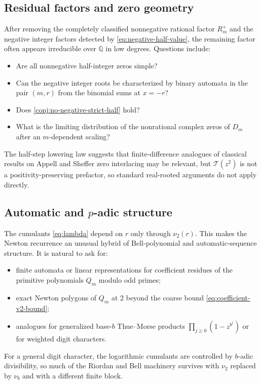 \documentclass[11pt,oneside]{article}
\theoremstyle{definition}
\theoremstyle{remark}
\newcommand{\Q}{\mathbb Q}
\newcommand{\Diag}{D}
\newcommand{\TM}{\mathcal T}
\newcommand{\vtwo}{\nu_{2}}
\begin{document}
\subsection{Residual factors and zero geometry}

After removing the completely classified nonnegative rational factor
$R_m^+$ and the negative integer factors detected by
\eqref{eq:negative-half-value}, the remaining factor often appears
irreducible over $\Q$ in low degrees.  Questions include:
\begin{itemize}
 \item Are all nonnegative half-integer zeros simple?
 \item Can the negative integer roots be characterized by binary automata in
       the pair $(m,r)$ from the binomial sums at $x=-r$?
 \item Does \cref{conj:no-negative-strict-half} hold?
 \item What is the limiting distribution of the nonrational complex zeros of
       $\Diag_m$ after an $m$-dependent scaling?
\end{itemize}
The half-step lowering law suggests that finite-difference analogues of
classical results on Appell and Sheffer zero interlacing may be relevant, but
$\TM(z^2)$ is not a positivity-preserving prefactor, so standard real-rooted
arguments do not apply directly.

\subsection{Automatic and \texorpdfstring{$p$-adic}{p-adic} structure}

The cumulants \eqref{eq:lambda} depend on $r$ only through $\vtwo(r)$.  This
makes the Newton recurrence an unusual hybrid of Bell-polynomial and
automatic-sequence structure.  It is natural to ask for:
\begin{itemize}
 \item finite automata or linear representations for coefficient residues of
       the primitive polynomials $Q_m$ modulo odd primes;
 \item exact Newton polygons of $Q_m$ at $2$ beyond the coarse bound
       \eqref{eq:coefficient-v2-bound};
 \item analogues for generalized base-$b$ Thue--Morse products
       $\prod_{j\ge0}(1-z^{b^j})$ or for weighted digit characters.
\end{itemize}
For a general digit character, the logarithmic cumulants are controlled by
$b$-adic divisibility, so much of the Riordan and Bell machinery survives
with $\vtwo$ replaced by $\nu_b$ and with a different finite block.
\end{document}

